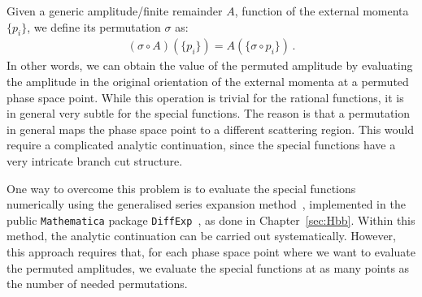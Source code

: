 \documentclass[main.tex]{subfiles}
\begin{document}
Given a generic amplitude/finite remainder $A$, function of the external momenta $\{p_i\}$, we define its permutation $\sigma$ as:
\begin{align}
\left(\sigma \circ A\right)\left(\{p_i\} \right) = A \left( \{ \sigma \circ p_i \}  \right) \,.
\end{align}
In other words, we can obtain the value of the permuted amplitude by evaluating the amplitude in the original orientation of the external momenta at a permuted phase space point. While this operation is trivial for the rational functions, it is in general very subtle for the special functions. The reason is that a permutation in general maps the phase space point to a different scattering region. This would require a complicated analytic continuation, since the special functions have a very intricate branch cut structure.

One way to overcome this problem is to evaluate the special functions numerically using the generalised series expansion method~\cite{Moriello:2019yhu}, implemented in the public \texttt{Mathematica} package \texttt{DiffExp}~\cite{Hidding:2020ytt}, as done in Chapter~\ref{sec:Hbb}. 
Within this method, the analytic continuation can be carried out systematically. However, this approach requires that, for each phase space point where we want to evaluate the permuted amplitudes, we evaluate the special functions at as many points as the number of needed permutations. 
\end{document}
